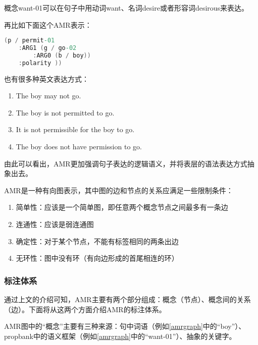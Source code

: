 \documentclass[master, winfont]{njuthesis}
\begin{document}
概念want-01可以在句子中用动词want、名词desire或者形容词desirous来表达。

再比如下面这个AMR表示：
\begin{lstlisting}[language=C]
(p / permit-01
	:ARG1 (g / go-02
		:ARG0 (b / boy))
	:polarity ))
\end{lstlisting}

也有很多种英文表达方式：
\begin{enumerate}
  \item The boy may not go.
  \item The boy is not permitted to go.
  \item It is not permissible for the boy to go.
  \item The boy does not have permission to go.
\end{enumerate}

由此可以看出，AMR更加强调句子表达的逻辑语义，并将表层的语法表达方式抽象出去。

AMR是一种有向图表示，其中图的边和节点的关系应满足一些限制条件\cite{Flanigan2014}：
\begin{enumerate}
  \item 简单性：应该是一个简单图，即任意两个概念节点之间最多有一条边
  \item 连通性：应该是弱连通图
  \item 确定性：对于某个节点，不能有标签相同的两条出边
  \item 无环性：图中没有环（有向边形成的首尾相连的环）
\end{enumerate}


\subsubsection{标注体系}
通过上文的介绍可知，AMR主要有两个部分组成：概念（节点）、概念间的关系（边）。下面将从这两个方面介绍AMR的标注体系。

AMR图中的“概念”主要有三种来源：句中词语（例如\ref{amrgraph}中的“boy”）、propbank中的语义框架（例如\ref{amrgraph}中的“want-01”）、抽象的关键字。
\end{document}

